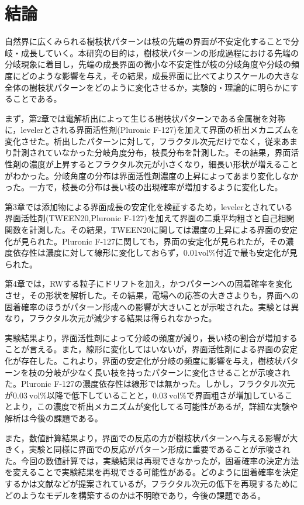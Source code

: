 \documentclass[autodetect-engine,dvi=dvipdfmx,a4paper,ja=standard,oneside,openany,11pt]{bxjsbook}
\begin{document}
\chapter{結論}
自然界に広くみられる樹枝状パターンは枝の先端の界面が不安定化することで分岐・成長していく。本研究の目的は，樹枝状パターンの形成過程における先端の分岐現象に着目し，先端の成長界面の微小な不安定性が枝の分岐角度や分岐の頻度にどのような影響を与え，その結果，成長界面に比べてよりスケールの大きな全体の樹枝状パターンをどのように変化させるか，実験的・理論的に明らかにすることである。

まず，第2章では電解析出によって生じる樹枝状パターンである金属樹を対称に，levelerとされる界面活性剤(Pluronic F-127)を加えて界面の析出メカニズムを変化させた。析出したパターンに対して，フラクタル次元だけでなく，従来あまり計測されていなかった分岐角度分布，枝長分布を計測した。その結果，界面活性剤の濃度が上昇するとフラクタル次元が小さくなり，細長い形状が増えることがわかった。分岐角度の分布は界面活性剤濃度の上昇によってあまり変化しなかった。一方で，枝長の分布は長い枝の出現確率が増加するように変化した。

第3章では添加物による界面成長の安定化を検証するため，levelerとされている界面活性剤(TWEEN20,Pluronic F-127)を加えて界面の二乗平均粗さと自己相関関数を計測した。その結果，TWEEN20に関しては濃度の上昇による界面の安定化が見られた。Pluronic F-127に関しても，界面の安定化が見られたが，その濃度依存性は濃度に対して線形に変化しておらず，$0.01 \mathrm{vol\%}$付近で最も安定化が見られた。

第4章では，RWする粒子にドリフトを加え，かつパターンへの固着確率を変化させ，その形状を解析した。その結果，電場への応答の大きさよりも，界面への固着確率のほうがパターン形成への影響が大きいことが示唆された。実験とは異なり，フラクタル次元が減少する結果は得られなかった。

実験結果より，界面活性剤によって分岐の頻度が減り，長い枝の割合が増加することが言える。また，線形に変化してはいないが，界面活性剤による界面の安定化が存在した。これより，界面の安定化が分岐の頻度に影響を与え，樹枝状パターンを枝の分岐が少なく長い枝を持ったパターンに変化させることが示唆された。Pluronic F-127の濃度依存性は線形では無かった。しかし，フラクタル次元が$\SI{0.03}{\mathrm{vol\%}}$以降で低下していることと，$\SI{0.03}{\mathrm{vol\%}}$で界面粗さが増加していることより，この濃度で析出メカニズムが変化してる可能性があるが，詳細な実験や解析は今後の課題である。

また，数値計算結果より，界面での反応の方が樹枝状パターンへ与える影響が大きく，実験と同様に界面での反応がパターン形成に重要であることが示唆された。今回の数値計算では，実験結果は再現できなかったが，固着確率の決定方法を変えることで実験結果を再現できる可能性がある。どのように固着確率を決定するかは文献\cite{vicsek1984pattern}\cite{nittmann1986tip}などが提案されているが，フラクタル次元の低下を再現するためにどのようなモデルを構築するのかは不明瞭であり，今後の課題である。

\ifdraft{
  
  
}{}
\end{document}
